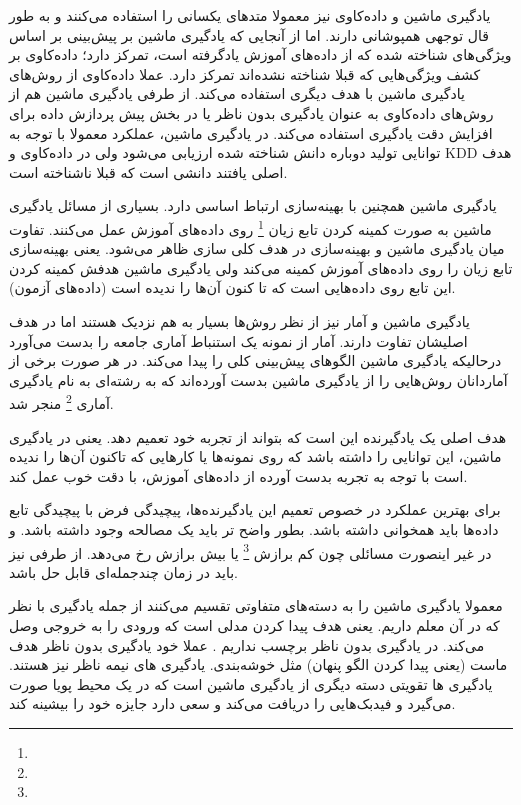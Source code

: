 \documentclass[a4paper, 12pt]{article}
\begin{document}
یادگیری ماشین و داده‌کاوی نیز معمولا متد‌های یکسانی را استفاده می‌کنند و به طور قال توجهی همپوشانی دارند. اما از آنجایی که یادگیری ماشین بر پیش‌بینی بر اساس ویژگی‌های شناخته شده که از داده‌های آموزش یادگرفته است، تمرکز دارد؛ داده‌کاوی بر کشف ویژگی‌هایی که قبلا شناخته نشده‌اند تمرکز دارد. عملا داده‌کاوی از روش‌های یادگیری ماشین با هدف دیگری استفاده می‌کند. از طرفی یادگیری ماشین هم از روش‌های داده‌کاوی به عنوان یادگیری بدون ناظر یا در بخش پیش پردازش داده برای افزایش دقت یادگیری استفاده می‌کند. در یادگیری ماشین، عملکرد معمولا با توجه به توانایی تولید دوباره دانش شناخته شده ارزیابی می‌شود ولی در داده‌کاوی و KDD هدف اصلی یافتند دانشی است که قبلا ناشناخته است. 

یادگیری ماشین همچنین با بهینه‌سازی ارتباط اساسی دارد. بسیاری از مسائل یادگیری ماشین به صورت کمینه کردن تابع زیان 
\footnote{}
روی داده‌های آموزش عمل می‌کنند.  
تفاوت میان یادگیری ماشین و بهینه‌سازی در هدف کلی سازی ظاهر می‌شود. یعنی بهینه‌سازی تابع زیان را روی داده‌های آموزش کمینه می‌کند ولی یادگیری ماشین هدفش کمینه کردن این تابع روی داده‌هایی است که تا کنون آن‌ها را ندیده است (داده‌های آزمون). 

یادگیری ماشین و آمار نیز از نظر روش‌ها بسیار به هم نزدیک هستند اما در هدف اصلیشان تفاوت دارند. آمار از نمونه یک استنباط آماری جامعه را بدست می‌آورد درحالیکه یادگیری ماشین الگو‌های پیش‌بینی کلی را پیدا می‌کند. در هر صورت برخی از آماردانان روش‌هایی را از یادگیری ماشین بدست آورده‌اند  که به رشته‌ای به نام یادگیری آماری 
\footnote{}
منجر شد.
   
   هدف اصلی یک یادگیرنده این است که بتواند از تجربه خود تعمیم دهد. یعنی در یادگیری ماشین، این توانایی را داشته باشد که روی نمونه‌ها یا کار‌هایی که تاکنون آن‌ها را ندیده است با توجه به تجربه بدست آورده از داده‌های آموزش، با دقت خوب عمل کند. 
   
   برای بهترین عملکرد در خصوص تعمیم این یادگیرنده‌ها، پیچیدگی فرض با پیچیدگی تابع داده‌ها باید همخوانی داشته باشد. بطور واضح تر باید یک مصالحه وجود داشته باشد. و در غیر اینصورت مسائلی چون کم برازش 
   \footnote{}
   یا بیش برازش
   رخ می‌دهد. از طرفی نیز باید در زمان چندجمله‌ای قابل حل باشد.
   
   معمولا یادگیری ماشین را به دسته‌های متفاوتی تقسیم می‌کنند از جمله یادگیری با نظر که در آن معلم داریم. یعنی هدف پیدا کردن مدلی است که ورودی را به خروجی وصل می‌کند. در یادگیری بدون ناظر برچسب نداریم . عملا خود یادگیری بدون ناظر هدف ماست (یعنی پیدا کردن الگو پنهان) مثل خوشه‌بندی. یادگیری های نیمه ناظر نیز هستند. یادگیری ها تقویتی دسته دیگری از یادگیری ماشین است که در یک محیط پویا صورت می‌گیرد و فیدبک‌هایی را دریافت می‌کند و سعی دارد جایزه خود را بیشینه کند. 
   
\end{document}
